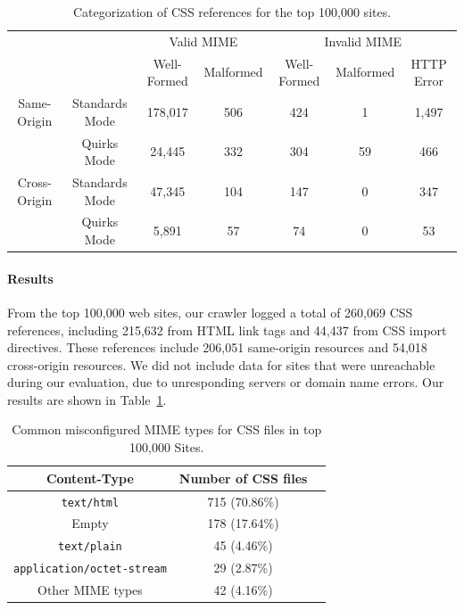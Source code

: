 \documentclass{acm_proc_article-sp}
\begin{document}
\begin{table}
\centering
\begin{tabular}{|c|c|c|c|c|c|c|} \hline
\multicolumn{2}{|c|}{}&\multicolumn{2}{|c|}{Valid MIME}&\multicolumn{3}{|c|}{Invalid MIME}\\
\cline{3-7}\multicolumn{2}{|c|}{}&Well-Formed&Malformed&Well-Formed&Malformed&HTTP Error\\ \hline
Same-Origin&Standards Mode&178,017&506&424&1&1,497\\ 
\cline{2-7}&Quirks Mode&24,445&332&304&59&466\\ \hline
Cross-Origin&Standards Mode&47,345&104&147&0&347\\
\cline{2-7}&Quirks Mode&5,891&57&74&0&53\\ \hline
\end{tabular}
\caption{Categorization of CSS references for the top 100,000 sites.}
\label{table:results}
\end{table}

\paragraph{Results}
From the top 100,000 web sites, our crawler logged a total of 260,069 CSS references, including 215,632 from HTML link tags and 44,437 from CSS import directives. These references include 206,051 same-origin resources and 54,018 cross-origin resources. We did not include data for sites that were unreachable during our evaluation, due to unresponding servers or domain name errors. Our results are shown in Table~\ref{table:results}.

\begin{table}
\centering
\begin{tabular}{|c|c|c|} \hline
Content-Type&Number of CSS files\\ \hline
\texttt{text/html}&715 (70.86\%)\\ \hline
Empty &178 (17.64\%)\\ \hline
\texttt{text/plain}&45 (4.46\%)\\ \hline
\texttt{application/octet-stream}&29 (2.87\%)\\ \hline
Other MIME types&42 (4.16\%)\\
\hline\end{tabular}
\caption{Common misconfigured MIME types for CSS files in top 100,000 Sites.}
\label{table:MIME}
\end{table}
\end{document}

